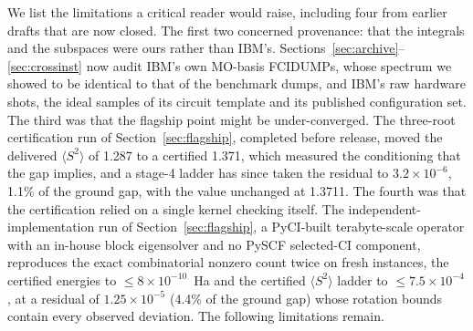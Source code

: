 \documentclass[11pt]{article}
\newcommand{\ssq}{\ensuremath{\langle S^2\rangle}}
\begin{document}
We list the limitations a critical reader would raise, including four from earlier drafts that are now closed. The first two concerned provenance: that the integrals and the subspaces were ours rather than IBM's. Sections~\ref{sec:archive}--\ref{sec:crossinst} now audit IBM's own MO-basis FCIDUMPs, whose spectrum we showed to be identical to that of the benchmark dumps, and IBM's raw hardware shots, the ideal samples of its circuit template and its published configuration set. The third was that the flagship point might be under-converged. The three-root certification run of Section~\ref{sec:flagship}, completed before release, moved the delivered \ssq{} of 1.287 to a certified 1.371, which measured the conditioning that the gap implies, and a stage-4 ladder has since taken the residual to $3.2\times10^{-6}$, 1.1\% of the ground gap, with the value unchanged at 1.3711. The fourth was that the certification relied on a single kernel checking itself. The independent-implementation run of Section~\ref{sec:flagship}, a PyCI-built terabyte-scale operator with an in-house block eigensolver and no PySCF selected-CI component, reproduces the exact combinatorial nonzero count twice on fresh instances, the certified energies to $\le8\times10^{-10}$~Ha and the certified \ssq{} ladder to $\le7.5\times10^{-4}$, at a residual of $1.25\times10^{-5}$ (4.4\% of the ground gap) whose rotation bounds contain every observed deviation. The following limitations remain.
\end{document}
